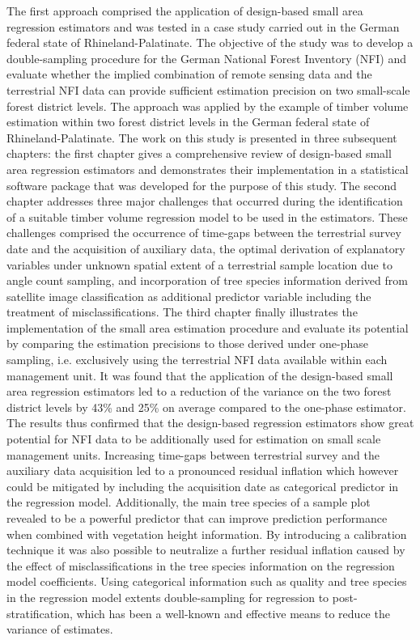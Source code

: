 The first approach comprised the application of design-based small area regression estimators and was tested in a case study carried out in the German federal state of Rhineland-Palatinate. The objective of the study was to develop a double-sampling procedure for the German National Forest Inventory (NFI) and evaluate whether the implied combination of remote sensing data and the terrestrial NFI data can provide sufficient estimation precision on two small-scale forest district levels. The approach was applied by the example of timber volume estimation within two forest district levels in the German federal state of Rhineland-Palatinate. The work on this study is presented in three subsequent chapters: the first chapter gives a comprehensive review of design-based small area regression estimators and demonstrates their implementation in a statistical software package that was developed for the purpose of this study. The second chapter addresses three major challenges that occurred during the identification of a suitable timber volume regression model to be used in the estimators. These challenges comprised the occurrence of time-gaps between the terrestrial survey date and the acquisition of auxiliary data, the optimal derivation of explanatory variables under unknown spatial extent of a terrestrial sample location due to angle count sampling, and incorporation of tree species information derived from satellite image classification as additional predictor variable including the treatment of misclassifications. The third chapter finally illustrates the implementation of the small area estimation procedure and evaluate its potential by comparing the estimation precisions to those derived under one-phase sampling, i.e. exclusively using the terrestrial NFI data available within each management unit. It was found that the application of the design-based small area regression estimators led to a reduction of the variance on the two forest district levels by 43\% and 25\% on average compared to the one-phase estimator. The results thus confirmed that the design-based regression estimators show great potential for NFI data to be additionally used for estimation on small scale management units. Increasing time-gaps between terrestrial survey and the auxiliary data acquisition led to a pronounced residual inflation which however could be mitigated by including the acquisition date as categorical predictor in the regression model. Additionally, the main tree species of a sample plot revealed to be a powerful predictor that can improve prediction performance when combined with vegetation height information. By introducing a calibration technique it was also possible to neutralize a further residual inflation caused by the effect of misclassifications in the tree species information on the regression model coefficients. Using categorical information such as quality and tree species in the regression model extents double-sampling for regression to post-stratification, which has been a well-known and effective means to reduce the variance of estimates.\par

